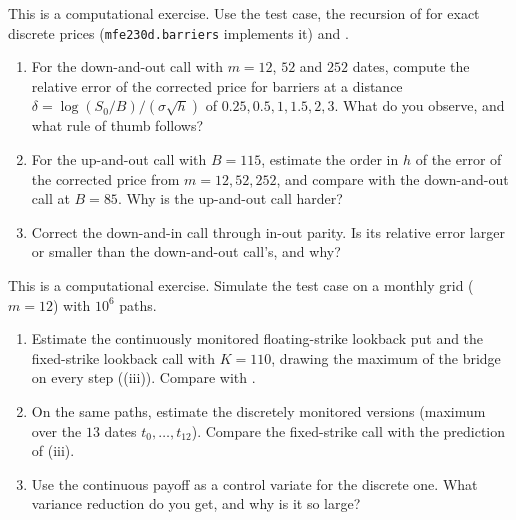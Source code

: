 \begin{exercise}\label{ex:bar-bgk-limits}
\medium This is a computational exercise. Use the test case, the recursion of
 for exact discrete prices (\texttt{mfe230d.barriers} implements it) and
.
\begin{enumerate}[label=(\alph*)]
  \item For the down-and-out call with $m=12$, $52$ and $252$ dates, compute the relative error of
    the corrected price for barriers at a distance $\delta=\log(S_0/B)/(\sigma\sqrt h)$ of
    $0.25,0.5,1,1.5,2,3$. What do you observe, and what rule of thumb follows?
  \item For the up-and-out call with $B=115$, estimate the order in $h$ of the error of the corrected
    price from $m=12,52,252$, and compare with the down-and-out call at $B=85$. Why is the
    up-and-out call harder?
  \item Correct the down-and-in call through in-out parity. Is its relative error larger or smaller
    than the down-and-out call's, and why?
\end{enumerate}
\end{exercise}

\begin{exercise}\label{ex:bar-lookback-mc}
\medium This is a computational exercise. Simulate the test case on a monthly grid ($m=12$) with
$10^6$ paths.
\begin{enumerate}[label=(\alph*)]
  \item Estimate the continuously monitored floating-strike lookback put and the fixed-strike lookback
    call with $K=110$, drawing the maximum of the bridge on every step
    ((iii)). Compare with .
  \item On the same paths, estimate the discretely monitored versions (maximum over the $13$ dates
    $t_0,\dots,t_{12}$). Compare the fixed-strike call with the prediction of
    (iii).
  \item Use the continuous payoff as a control variate for the discrete one. What variance reduction
    do you get, and why is it so large?
\end{enumerate}
\end{exercise}

